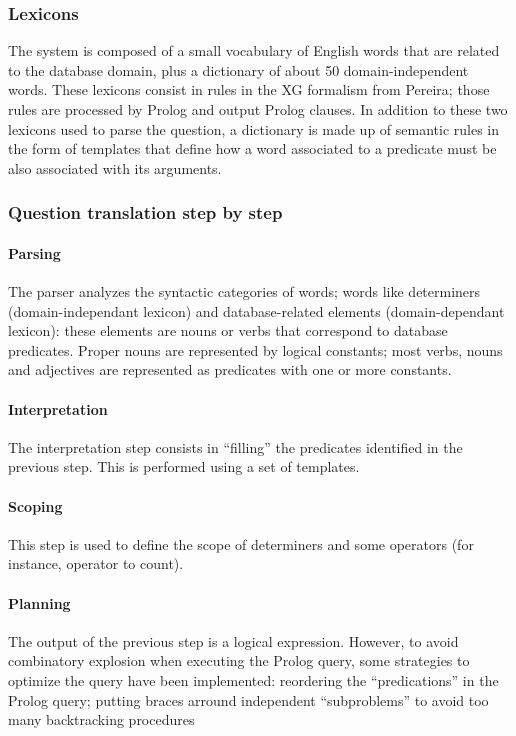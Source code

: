 \documentclass[10pt,journal,letterpaper,compsoc]{IEEEtran}
\begin{document}
\subsubsection{Lexicons}
The system is composed of a small vocabulary of
English words that are related to the database domain, plus a dictionary of
about 50 domain-independent words.
These lexicons consist in rules in the XG formalism from Pereira; those rules
are processed by Prolog and output Prolog clauses.
In addition to these two lexicons used to parse the question, a dictionary is
made up of semantic rules in the form of templates that define how a word
associated to a predicate must be also associated with its arguments.


\subsubsection{Question translation step by step}
\paragraph{Parsing}
The parser analyzes the syntactic categories of words; words like determiners
(domain-independant lexicon) and database-related elements (domain-dependant
lexicon): these elements are nouns or verbs that correspond to database
predicates.
Proper nouns are represented by logical constants; most verbs, nouns and
adjectives are represented as predicates with one or more constants.

\paragraph{Interpretation}
The interpretation step consists in ``filling'' the predicates identified in the
previous step. This is performed using a set of templates.


\paragraph{Scoping}
This step is used to define the scope of determiners and some operators (for
instance, operator to count). 

\paragraph{Planning}
The output of the previous step is a logical expression. 
However, to avoid combinatory explosion when executing the Prolog query, some
strategies to optimize the query have been implemented: reordering the
``predications'' in the Prolog query; putting braces arround independent
``subproblems'' to avoid too many backtracking procedures
\end{document}
